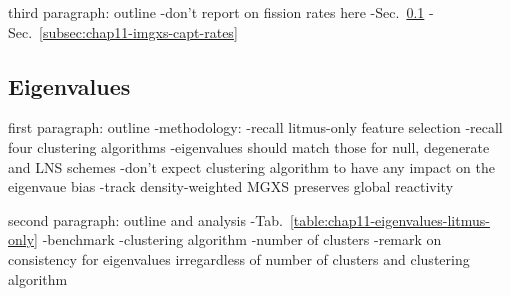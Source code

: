 third paragraph: outline
-don't report on fission rates here
-Sec.~\ref{subsec:chap11-imgxs-eigenvalues}
-Sec.~\ref{subsec:chap11-imgxs-capt-rates}

\subsection{Eigenvalues}
\label{subsec:chap11-imgxs-eigenvalues}

first paragraph: outline
-methodology:
  -recall litmus-only feature selection
  -recall four clustering algorithms
-eigenvalues should match those for null, degenerate and LNS schemes
  -don't expect clustering algorithm to have any impact on the eigenvaue bias
  -track density-weighted \ac{MGXS} preserves global reactivity

second paragraph: outline and analysis
-Tab.~\ref{table:chap11-eigenvalues-litmus-only}
  -benchmark
  -clustering algorithm
  -number of clusters
-remark on consistency for eigenvalues irregardless of number of clusters and clustering algorithm

